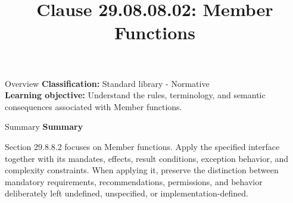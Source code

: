 \documentclass[10pt,letterpaper]{article}
\title{Clause 29.08.08.02: Member Functions}
\author{}
\date{}
\begin{document}
\maketitle
\begin{CornellOverviewBox}{Overview}
\textbf{Classification:} Standard library - Normative\\[2pt]
\textbf{Learning objective:} Understand the rules, terminology, and semantic consequences associated with Member functions.
\end{CornellOverviewBox}\begin{CornellSummaryBox}{Summary}
{\sffamily\bfseries\color{Accent} Summary}\par\vspace{3pt}Section 29.8.8.2 focuses on Member functions. Apply the specified interface together with its mandates, effects, result conditions, exception behavior, and complexity constraints. When applying it, preserve the distinction between mandatory requirements, recommendations, permissions, and behavior deliberately left undefined, unspecified, or implementation-defined.
\end{CornellSummaryBox}
\end{document}
